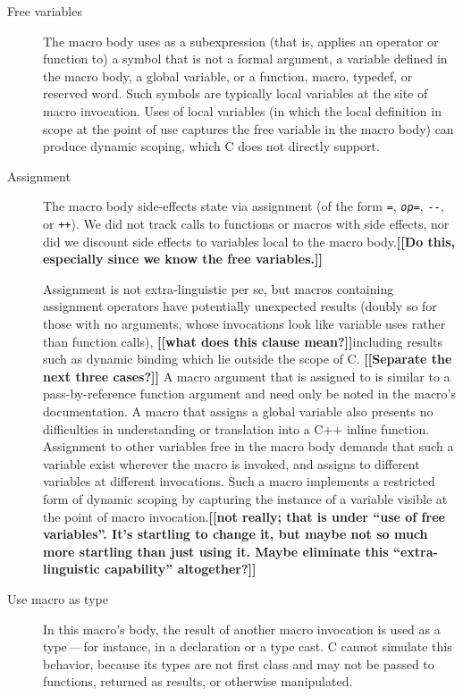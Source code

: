 \documentclass[10pt]{article}
\newcommand{\comment}[1]{\textbf{[[#1]]}}
\begin{document}
\begin{description}
\item[Free variables]\label{page:freevar}
  The macro body uses as a subexpression (that is, applies an operator or
  function to) a symbol that is not a formal argument, a variable defined
  in the macro body, a global variable, or a function, macro, typedef, or
  reserved word.  Such symbols are typically local variables at the site of
  macro invocation.  Uses of local variables (in which the local definition
  in scope at the point of use captures the free variable in the macro
  body) can produce dynamic scoping, which C does not directly support.

\item[Assignment]
  The macro body side-effects state via assignment (of the form {\tt =},
  {\tt {\em op}=}, {\tt -{}-}, or {\tt ++}).  We did not track calls to
  functions or macros with side effects, nor did we discount side
  effects to variables local to the macro body.\comment{Do this, especially
  since we know the free variables.}
  
  Assignment is not extra-linguistic per se, but macros containing
  assignment operators have potentially unexpected results (doubly so for
  those with no arguments, whose invocations look like variable uses rather
  than function calls), \comment{what does this clause mean?}including results such as dynamic binding which lie
  outside the scope of C\@.
  \comment{Separate the next three cases?}
  A macro argument that is assigned to is
  similar to a pass-by-reference function argument and need only be noted
  in the macro's documentation.  A macro that assigns a global variable
  also presents no difficulties in understanding or translation into a C++
  inline function.  Assignment to other variables free in the macro body
  demands that such a variable exist wherever the macro is invoked, and
  assigns to different variables at different invocations.  Such a macro
  implements a restricted form of dynamic scoping by capturing the instance
  of a variable visible at the point of macro invocation.\comment{not
  really; that is under ``use of free variables''.  It's startling to
  change it, but maybe not so much more startling than just using it.
  Maybe eliminate this ``extra-linguistic capability'' altogether?}

\item[Use macro as type]
  In this macro's body, the result of another macro invocation is used as a
  type\,---\,for instance, in a declaration or a type cast.  C cannot
  simulate this behavior, because its types are not first class and may not
  be passed to functions, returned as results, or otherwise manipulated.


\end{description}
\end{document}
